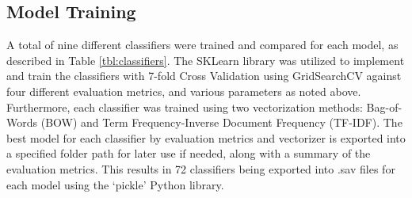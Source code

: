 \documentclass[12pt]{article}
\begin{document}
\newpage

\subsection{Model Training}
A total of nine different classifiers were trained and compared for each model, as described in Table \ref{tbl:classifiers}. The SKLearn library was utilized to implement and train the classifiers with 7-fold Cross Validation using GridSearchCV against four different evaluation metrics, and various parameters as noted above. Furthermore, each classifier was trained using two vectorization methods: Bag-of-Words (BOW) and Term Frequency-Inverse Document Frequency (TF-IDF). The best model for each classifier by evaluation metrics and vectorizer is exported into a specified folder path for later use if needed, along with a summary of the evaluation metrics. This results in 72 classifiers being exported into .sav files for each model using the ‘pickle’ Python library.  
\end{document}
